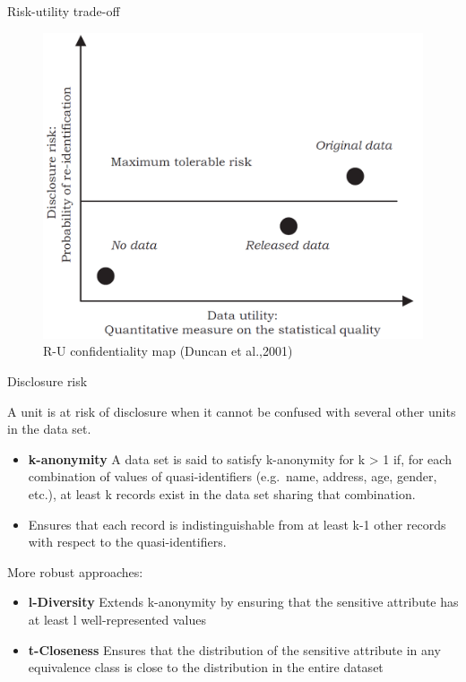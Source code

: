 \documentclass[
	aspectratio = 169
 ]{beamer}
\begin{document}
\begin{frame}{Risk-utility trade-off}

\begin{figure}
    \centering
    \includegraphics[width=0.55\linewidth
                    ]{Presentation//gallery/R-U confidentiality map.png}
    \caption{R-U confidentiality map (Duncan et al.,2001)}
\end{figure}

\end{frame}

\begin{frame}{Disclosure risk}

A unit is at risk of disclosure when it cannot be confused with several
other units in the data set.

\begin{itemize}
\item
  \textbf{k-anonymity} A data set is said to satisfy k-anonymity for k
  \textgreater{} 1 if, for each combination of values of
  quasi-identifiers (e.g.~name, address, age, gender, etc.), at least k
  records exist in the data set sharing that combination.
\item
  Ensures that each record is indistinguishable from at least k-1 other
  records with respect to the quasi-identifiers.
\end{itemize}

More robust approaches:

\begin{itemize}
\item
  \textbf{l-Diversity} Extends k-anonymity by ensuring that the
  sensitive attribute has at least l well-represented values
\item
  \textbf{t-Closeness} Ensures that the distribution of the sensitive
  attribute in any equivalence class is close to the distribution in the
  entire dataset
\end{itemize}
\end{frame}
\end{document}
